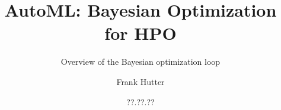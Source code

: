 %  


%

\usepackage[export]{adjustbox}
\usepackage{pgfpages}

\title[AutoML: Bayesian Optimization for HPO]{AutoML: Bayesian Optimization for HPO}
\subtitle{Overview of the Bayesian optimization loop}
\author[Frank Hutter]{Frank Hutter}
\date{??.??.??}




	
	\maketitle
	
    
    
    
    
    
    


